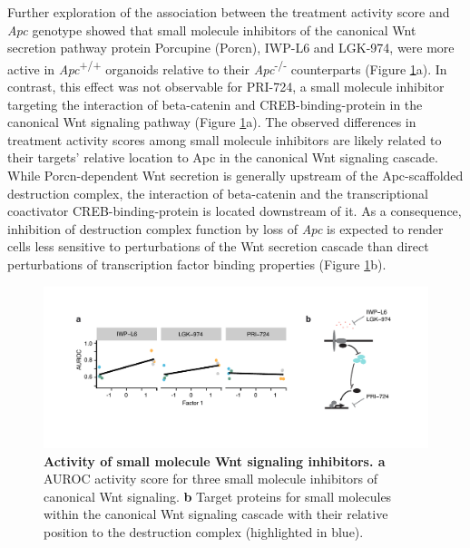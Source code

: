 \begin{flushleft}
Further exploration of the association between the treatment activity score and \textit{Apc} genotype showed that small molecule inhibitors of the canonical Wnt secretion pathway protein Porcupine (Porcn), IWP-L6 and LGK-974, were more active in \textit{Apc}\textsuperscript{+/+} organoids relative to their \textit{Apc}\textsuperscript{-/-}  counterparts \parencite{liuTargetingWntdrivenCancer2013} (Figure \ref{fig_199}a). In contrast, this effect was not observable for PRI-724, a small molecule inhibitor targeting the interaction of beta-catenin and CREB-binding-protein in the canonical Wnt signaling pathway \parencite{okazakiNovelInhibitorPRI7242019} (Figure \ref{fig_199}a). The observed differences in treatment activity scores among small molecule inhibitors are likely related to their targets' relative location to Apc in the canonical Wnt signaling cascade. While Porcn-dependent Wnt secretion is generally upstream of the Apc-scaffolded destruction complex, the interaction of beta-catenin and the transcriptional coactivator CREB-binding-protein is located downstream of it. As a consequence, inhibition of destruction complex function by loss of \textit{Apc} is expected to render cells less sensitive to perturbations of the Wnt secretion cascade than direct perturbations of transcription factor binding properties (Figure \ref{fig_199}b).

\begin{figure}[h!]
\centering
\includegraphics[scale=0.75,keepaspectratio]{figures/adenomaprofiling/pdf/fig_2_2_1.pdf}
\caption[Activity of small molecule Wnt signaling inhibitors]{\textbf{Activity of small molecule Wnt signaling inhibitors. a} AUROC activity score for three small molecule inhibitors of canonical Wnt signaling. \textbf{b} Target proteins for small molecules within the canonical Wnt signaling cascade with their relative position to the destruction complex (highlighted in blue).}
\label{fig_199}
\end{figure}
\bigbreak


\end{flushleft}
